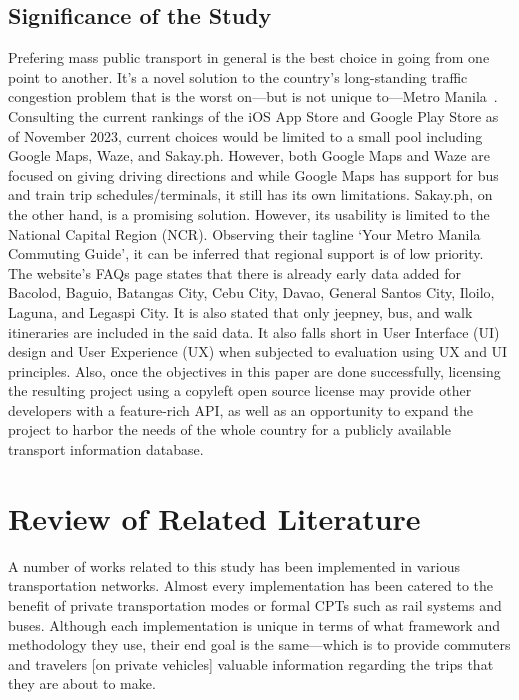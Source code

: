 \documentclass[journal]{./IEEE/IEEEtran}
\begin{document}
\subsection{Significance of the Study}
Prefering mass public transport in general is the best choice in going from one point to another. %
It's a novel solution to the country's long-standing traffic congestion problem that is the worst on---but is not unique to---Metro Manila~\cite{RamizoJr19}.
Consulting the current rankings of the iOS App Store and Google Play Store as of November 2023, current choices would be limited to a small pool including Google Maps, Waze, and Sakay.ph. However, both Google Maps and Waze are focused on giving driving directions and while Google Maps has support for bus and train trip schedules/terminals, it still has its own limitations.
Sakay.ph, on the other hand, is a promising solution. However, its usability is limited to the National Capital Region (NCR). Observing their tagline `Your Metro Manila Commuting Guide', it can be inferred that regional support is of low priority. The website's FAQs page states that there is already early data added for Bacolod, Baguio, Batangas City, Cebu City, Davao, General Santos City, Iloilo, Laguna, and Legaspi City.
It is also stated that only jeepney, bus, and walk itineraries are included in the said data. %
It also falls short in User Interface (UI) design and User Experience (UX) when subjected to evaluation using UX and UI principles. %
Also, once the objectives in this paper are done successfully, licensing the resulting project using a copyleft open source license may provide other developers with a feature-rich API, as well as an opportunity to expand the
project to harbor the needs of the whole country for a publicly available transport information database. 

\section{Review of Related Literature}
A number of works related to this study has been implemented in various transportation networks. Almost every implementation has been catered to the benefit of private transportation modes or formal CPTs such as rail systems and buses.
Although each implementation is unique in terms of what framework and methodology they use, their end goal is the same---which is to provide commuters and travelers [on private vehicles] valuable information regarding the trips that they are about to make.
\end{document}
